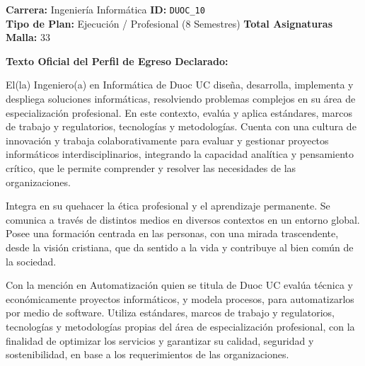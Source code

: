 \documentclass[11pt,a4paper]{article}
\begin{document}
\vspace{10pt}

\begin{tcolorbox}[fichaStyle, title={UNIVERSIDAD 10: Duoc UC}]
\small\sffamily
\textbf{Carrera:} Ingeniería Informática \hfill \textbf{ID:} \texttt{DUOC\_10} \\
\textbf{Tipo de Plan:} Ejecución / Profesional (8 Semestres) \hfill \textbf{Total Asignaturas Malla:} 33

\tcbline

\textbf{Texto Oficial del Perfil de Egreso Declarado:}\\[4pt]
{\small\rmfamily
El(la) Ingeniero(a) en Informática de Duoc UC diseña, desarrolla, implementa y despliega soluciones informáticas, resolviendo problemas complejos en su área de especialización profesional. En este contexto, evalúa y aplica estándares, marcos de trabajo y regulatorios, tecnologías y metodologías. Cuenta con una cultura de innovación y trabaja colaborativamente para evaluar y gestionar proyectos informáticos interdisciplinarios, integrando la capacidad analítica y pensamiento crítico, que le permite comprender y resolver las necesidades de las organizaciones.

\vspace{4pt}
Integra en su quehacer la ética profesional y el aprendizaje permanente. Se comunica a través de distintos medios en diversos contextos en un entorno global. Posee una formación centrada en las personas, con una mirada trascendente, desde la visión cristiana, que da sentido a la vida y contribuye al bien común de la sociedad.

\vspace{4pt}
Con la mención en Automatización quien se titula de Duoc UC evalúa técnica y económicamente proyectos informáticos, y modela procesos, para automatizarlos por medio de software. Utiliza estándares, marcos de trabajo y regulatorios, tecnologías y metodologías propias del área de especialización profesional, con la finalidad de optimizar los servicios y garantizar su calidad, seguridad y sostenibilidad, en base a los requerimientos de las organizaciones.
}
\end{tcolorbox}

\newpage
\end{document}
